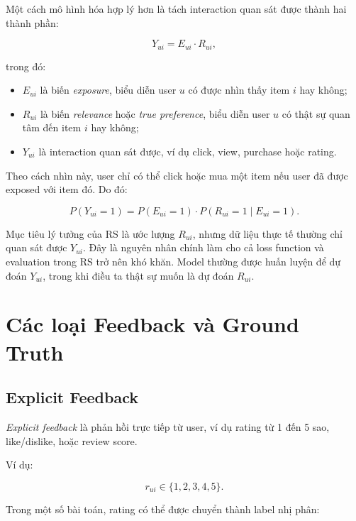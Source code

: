\documentclass[12pt,a4paper]{article}
\begin{document}
Một cách mô hình hóa hợp lý hơn là tách interaction quan sát được thành hai thành phần:

\begin{equation}
Y_{ui} = E_{ui} \cdot R_{ui},
\end{equation}

trong đó:

\begin{itemize}[leftmargin=*]
    \item $E_{ui}$ là biến \textit{exposure}, biểu diễn user $u$ có được nhìn thấy item $i$ hay không;
    \item $R_{ui}$ là biến \textit{relevance} hoặc \textit{true preference}, biểu diễn user $u$ có thật sự quan tâm đến item $i$ hay không;
    \item $Y_{ui}$ là interaction quan sát được, ví dụ click, view, purchase hoặc rating.
\end{itemize}

Theo cách nhìn này, user chỉ có thể click hoặc mua một item nếu user đã được exposed với item đó. Do đó:

\begin{equation}
P(Y_{ui}=1) = P(E_{ui}=1) \cdot P(R_{ui}=1 \mid E_{ui}=1).
\end{equation}

Mục tiêu lý tưởng của RS là ước lượng $R_{ui}$, nhưng dữ liệu thực tế thường chỉ quan sát được $Y_{ui}$. Đây là nguyên nhân chính làm cho cả loss function và evaluation trong RS trở nên khó khăn. Model thường được huấn luyện để dự đoán $Y_{ui}$, trong khi điều ta thật sự muốn là dự đoán $R_{ui}$.

\section{Các loại Feedback và Ground Truth}

\subsection{Explicit Feedback}

\textit{Explicit feedback} là phản hồi trực tiếp từ user, ví dụ rating từ 1 đến 5 sao, like/dislike, hoặc review score.

Ví dụ:

\begin{equation}
r_{ui} \in \{1,2,3,4,5\}.
\end{equation}

Trong một số bài toán, rating có thể được chuyển thành label nhị phân:
\end{document}
